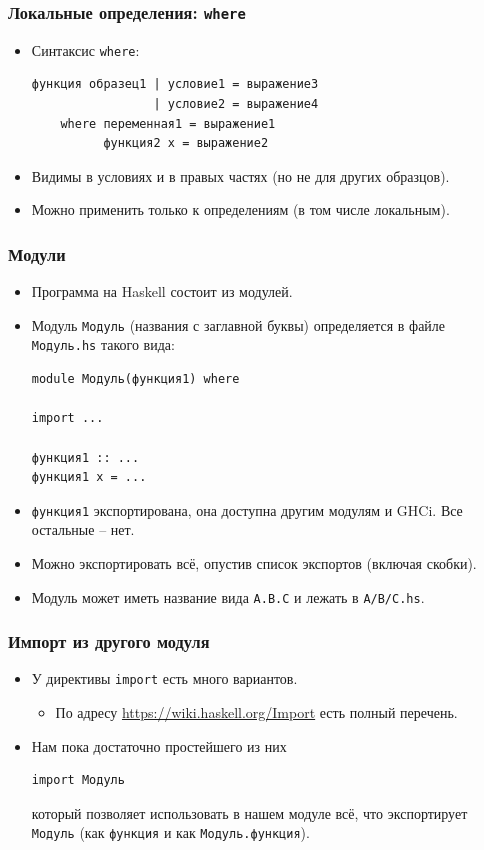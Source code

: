\documentclass[10pt]{beamer}
\begin{document}
\begin{frame}[fragile]
\frametitle{Локальные определения: \lstinline[basicstyle=\ttfamily]|where|}
\begin{itemize}
    \item Синтаксис \lstinline|where|:
\begin{lstlisting}
функция образец1 | условие1 = выражение3
                 | условие2 = выражение4
    where переменная1 = выражение1
          функция2 x = выражение2
\end{lstlisting}
    \item Видимы в условиях и в правых частях (но не для других образцов).
    \item Можно применить только к определениям (в том числе локальным).
\end{itemize}
\end{frame}

\begin{frame}[fragile]
\frametitle{Модули}
\begin{itemize}
    \item Программа на Haskell состоит из модулей.
    \item Модуль \lstinline|Модуль| (названия с заглавной буквы) определяется в файле \lstinline|Модуль.hs| такого вида:
\begin{lstlisting}
module Модуль(функция1) where

import ...

функция1 :: ...
функция1 x = ...
\end{lstlisting}
\item \lstinline|функция1| экспортирована, она доступна другим модулям и GHCi. Все остальные -- нет.
\item Можно экспортировать всё, опустив список экспортов (включая скобки).
\item Модуль может иметь название вида \lstinline|A.B.C| и лежать в \lstinline|A/B/C.hs|.
\end{itemize}
\end{frame}

\begin{frame}[fragile]
\frametitle{Импорт из другого модуля}
\begin{itemize}
    \item У директивы \lstinline|import| есть много вариантов.
    \begin{itemize}
        \item По адресу \url{https://wiki.haskell.org/Import} есть полный перечень.
    \end{itemize}
    \item Нам пока достаточно простейшего из них
\begin{lstlisting}
import Модуль
\end{lstlisting}
    который позволяет использовать в нашем модуле всё, что экспортирует \lstinline|Модуль| (как \lstinline|функция| и как \lstinline|Модуль.функция|).
\end{itemize}
\end{frame}
\end{document}
